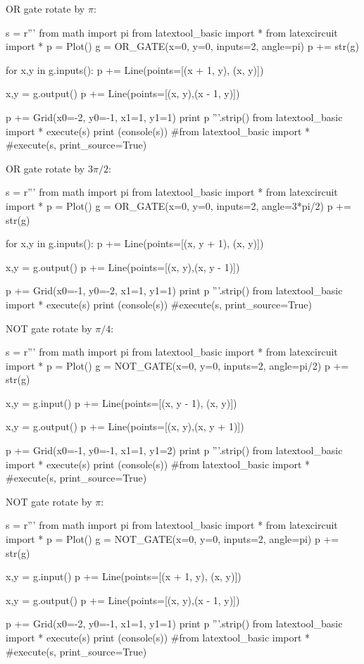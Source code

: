 \newpage
OR gate rotate by $\pi$:
\begin{python}
s = r'''
from math import pi
from latextool_basic import *
from latexcircuit import *
p = Plot()
g = OR_GATE(x=0, y=0, inputs=2, angle=pi)
p += str(g)

for x,y in g.inputs():
    p += Line(points=[(x + 1, y), (x, y)])

x,y = g.output()
p += Line(points=[(x, y),(x - 1, y)])

p += Grid(x0=-2, y0=-1, x1=1, y1=1)
print p
'''.strip()
from latextool_basic import *
execute(s)
print (console(s))
#from latextool_basic import *
#execute(s, print_source=True)
\end{python}


\newpage
OR gate rotate by $3\pi/2$:
\begin{python}
s = r'''
from math import pi
from latextool_basic import *
from latexcircuit import *
p = Plot()
g = OR_GATE(x=0, y=0, inputs=2, angle=3*pi/2)
p += str(g)

for x,y in g.inputs():
    p += Line(points=[(x, y + 1), (x, y)])

x,y = g.output()
p += Line(points=[(x, y),(x, y - 1)])

p += Grid(x0=-1, y0=-2, x1=1, y1=1)
print p
'''.strip()
from latextool_basic import *
execute(s)
print (console(s))
#execute(s, print_source=True)
\end{python}





\newpage
NOT gate rotate by $\pi/4$:
\begin{python}
s = r'''
from math import pi
from latextool_basic import *
from latexcircuit import *
p = Plot()
g = NOT_GATE(x=0, y=0, inputs=2, angle=pi/2)
p += str(g)

x,y = g.input()
p += Line(points=[(x, y - 1), (x, y)])

x,y = g.output()
p += Line(points=[(x, y),(x, y + 1)])

p += Grid(x0=-1, y0=-1, x1=1, y1=2)
print p
'''.strip()
from latextool_basic import *
execute(s)
print (console(s))
#from latextool_basic import *
#execute(s, print_source=True)
\end{python}


\newpage
NOT gate rotate by $\pi$:
\begin{python}
s = r'''
from math import pi
from latextool_basic import *
from latexcircuit import *
p = Plot()
g = NOT_GATE(x=0, y=0, inputs=2, angle=pi)
p += str(g)

x,y = g.input()
p += Line(points=[(x + 1, y), (x, y)])

x,y = g.output()
p += Line(points=[(x, y),(x - 1, y)])

p += Grid(x0=-2, y0=-1, x1=1, y1=1)
print p
'''.strip()
from latextool_basic import *
execute(s)
print (console(s))
#from latextool_basic import *
#execute(s, print_source=True)
\end{python}



